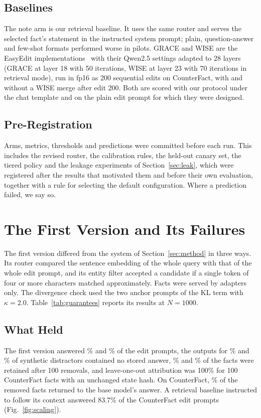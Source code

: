 \documentclass[journal,10pt]{IEEEtran}
\begin{document}
\subsection{Baselines}
The note arm is our retrieval baseline. It uses the same router and serves the selected
fact's statement in the instructed system prompt; plain, question-answer and few-shot
formats performed worse in pilots. GRACE and WISE are the EasyEdit
implementations~\cite{wang2024easyedit} with their Qwen2.5 settings adapted to 28 layers
(GRACE at layer 18 with 50 iterations, WISE at layer 23 with 70 iterations in retrieval
mode), run in fp16 as 200 sequential edits on CounterFact, with and without a WISE merge
after edit 200. Both are scored with our protocol under the chat template and on the
plain edit prompt for which they were designed.

\subsection{Pre-Registration}
Arms, metrics, thresholds and predictions were committed before each run. This includes
the revised router, the calibration rules, the held-out canary set, the tiered policy and
the leakage experiments of Section~\ref{sec:leak}, which were registered after the
results that motivated them and before their own evaluation, together with a rule for
selecting the default configuration. Where a prediction failed, we say so.

\section{The First Version and Its Failures}
\label{sec:v3}



The first version differed from the system of Section~\ref{sec:method} in three ways.
Its router compared the sentence embedding of the whole query with that of the whole edit
prompt, and its entity filter accepted a candidate if a single token of four or more
characters matched approximately. Facts were served by adapters only. The divergence
check used the two anchor prompts of the KL term with $\kappa=2.0$.
Table~\ref{tab:guarantees} reports its results at $N=1000$.

\subsection{What Held}
The first version answered \cfEffPct\% and \zsEffPct\% of the edit prompts, the outputs
for \cfNoLeakPct\% and \zsNoLeakPct\% of synthetic distractors contained no stored answer,
\cfRetainPct\% and \zsRetainPct\% of the facts were retained after 100 removals, and
leave-one-out attribution was 100\% for 100 CounterFact facts with an unchanged state
hash. On CounterFact, \cfReturnPct\% of the removed facts returned to the base model's
answer. A retrieval baseline instructed to follow its context answered 83.7\% of the
CounterFact edit prompts (Fig.~\ref{fig:scaling}).
\end{document}
